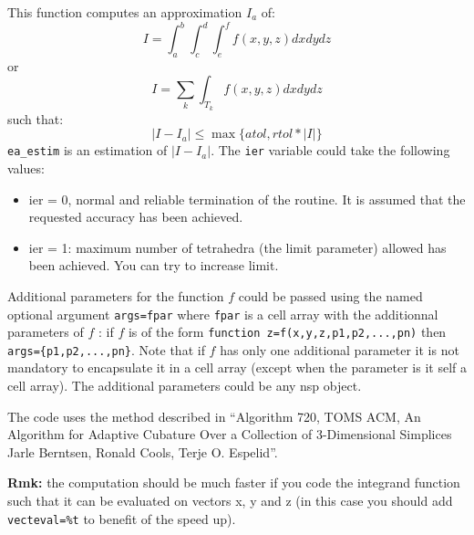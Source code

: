 \begin{mandescription}
This function computes an approximation $I_a$ of:
$$
   I = \int_a^b \int_c^d \int_e^f f(x,y,z) dxdydz
$$
or
$$
   I = \sum_k \int_{T_k} f(x,y,z) dxdydz
$$
such that:
$$
   | I - I_a | \le  \max \{ atol ,  rtol*|I| \}
$$
\verb+ea_estim+ is an estimation of $| I - I_a |$. The
\verb+ier+ variable could take the following values: 
\begin{itemize}
\item ier = 0,  normal and reliable termination of the routine. It is assumed that the
      requested  accuracy has been achieved.
\item ier = 1: maximum number of tetrahedra (the limit
      parameter) allowed has been achieved. You can try to
      increase limit.
\end{itemize}


Additional parameters for the function $f$ could be passed using the
named optional argument \verb+args=fpar+ where \verb+fpar+ is a cell array
with the additionnal parameters of $f$ : if $f$ is of the form 
\verb+function z=f(x,y,z,p1,p2,...,pn)+ then \verb+args={p1,p2,...,pn}+.
Note that if $f$ has only one additional parameter it is not mandatory 
to encapsulate it in a cell array (except when the parameter is it 
self a cell array). The additional parameters could be any nsp object.
 
The code uses the method described in ``Algorithm 720, TOMS ACM,
An Algorithm for Adaptive Cubature Over a Collection of 3-Dimensional Simplices
Jarle Berntsen, Ronald Cools, Terje O. Espelid''.

{\bf Rmk:} the computation should be much faster if you code the integrand function
such that it can be evaluated on vectors x, y and z (in this case you should add \verb+vecteval=%t+
to benefit of the speed up).

\end{mandescription}

